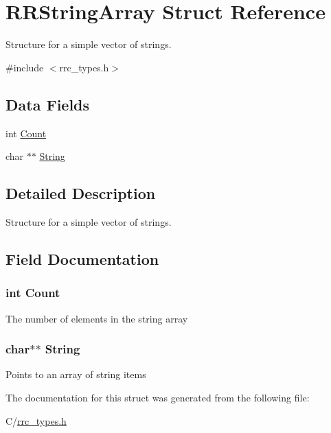 \hypertarget{struct_r_r_string_array}{\section{R\-R\-String\-Array Struct Reference}
\label{struct_r_r_string_array}
}


Structure for a simple vector of strings.  




{\ttfamily \#include $<$rrc\-\_\-types.\-h$>$}

\subsection*{Data Fields}
\begin{DoxyCompactItemize}
\item 
int \hyperlink{struct_r_r_string_array_aad462966ed963f892117056de1eba502}{Count}
\item 
char $\ast$$\ast$ \hyperlink{struct_r_r_string_array_acdbc34377baf3e52d9044aada0f2f511}{String}
\end{DoxyCompactItemize}


\subsection{Detailed Description}
Structure for a simple vector of strings. 

\subsection{Field Documentation}
\hypertarget{struct_r_r_string_array_aad462966ed963f892117056de1eba502}{
\subsubsection[{Count}]{\setlength{\rightskip}{0pt plus 5cm}int Count}}\label{struct_r_r_string_array_aad462966ed963f892117056de1eba502}
The number of elements in the string array \hypertarget{struct_r_r_string_array_acdbc34377baf3e52d9044aada0f2f511}{
\subsubsection[{String}]{\setlength{\rightskip}{0pt plus 5cm}char$\ast$$\ast$ String}}\label{struct_r_r_string_array_acdbc34377baf3e52d9044aada0f2f511}
Points to an array of string items 

The documentation for this struct was generated from the following file\-:\begin{DoxyCompactItemize}
\item 
C/\hyperlink{rrc__types_8h}{rrc\-\_\-types.\-h}\end{DoxyCompactItemize}

